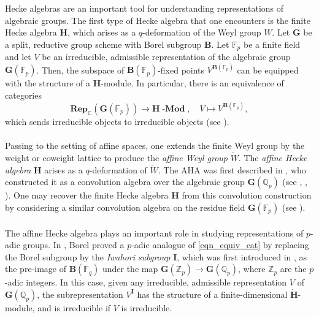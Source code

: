 \documentclass[a4paper]{report}
\theoremstyle{theorem}
\theoremstyle{definition}
\theoremstyle{remark}
\theoremstyle{proposition}
\theoremstyle{conjecture}
\theoremstyle{lemma}
\theoremstyle{corollary}
\theoremstyle{exercise}
\theoremstyle{example}
\newcommand{\C}{\mathbb{C}}
\newcommand{\on}{\operatorname}
\newcommand{\lmod}{\on{\mathbf{-Mod}}}
\begin{document}
  Hecke algebras are an important tool for understanding representations of algebraic groups. The first type of Hecke algebra that one encounters is the finite Hecke algebra $\mathbf{H}$, which arises 
  as a $q$-deformation of the Weyl group $W$. Let $\mathbf{G}$ be a split, 
  reductive group scheme with Borel subgroup $\mathbf{B}$. 
  Let $\mathbb{F}_p$ be a 
  finite field and let $V$ be an irreducible, admissible representation 
  of the algebraic group $\mathbf{G}(\mathbb{F}_p)$. Then, the subspace of 
  $\mathbf{B}(\mathbb{F}_p)$-fixed points $V^{\mathbf{B}(\mathbb{F}_p)}$ can be equipped with the structure
  of a $\mathbf{H}$-module. In particular, there is an equivalence of categories
  \begin{equation}\label{eqn_equiv_cat}
      \mathbf{Rep}_\C(\mathbf{G}(\mathbb{F}_p)) \longrightarrow \mathbf{H}\lmod,\quad V \longmapsto V^{\mathbf{B}(\mathbb{F}_p)},
  \end{equation}
  which sends irreducible objects to irreducible objects (see \cite{bum10}).\\\\
  Passing to the setting of affine spaces, one extends the finite Weyl group by the weight or coweight lattice to 
  produce the \emph{affine Weyl group} $\widetilde{W}$. The
  \emph{affine Hecke algebra} $\mathbf{\dot{H}}$ arises as a $q$-deformation
  of $\widetilde{W}$. 
  The AHA was first described in \cite{im65}, 
  who constructed it as a convolution algebra over the algebraic group $\mathbf{G}(\mathbb{Q}_p)$ 
  (see \cite{hkp10}, \cite{im65}, \cite{cai22}). One may recover the finite
  Hecke algebra $\mathbf{H}$ from this convolution construction by considering a similar convolution algebra on the residue
  field $\mathbf{G}(\mathbb{F}_p)$ (see \cite{bum10}). \\\\
  The affine Hecke algebra plays an important role in studying representations of
  $p$-adic groups. In \cite{bor76}, Borel proved a $p$-adic analogue
  of \eqref{eqn_equiv_cat} by replacing the Borel subgroup by the \emph{Iwahori 
  subgroup} $\mathbf{I}$, which was first
  introduced in \cite{im65}, as the pre-image of $\mathbf{B}(\mathbb{F}_q)$ under the map 
  $\mathbf{G}(\mathbb{Z}_p) \to \mathbf{G}(\mathbb{Q}_p)$, where $\mathbb{Z}_p$
  are the $p$-adic integers. 
  In this case, given any irreducible, admissible
  representation $V$ of $\mathbf{G}(\mathbb{Q}_p)$, the subrepresentation
  $V^{\mathbf{I}}$ has the structure of a finite-dimensional $\mathbf{\dot{H}}$-module, and is 
  irreducible if $V$ is irreducible. 
\end{document}
